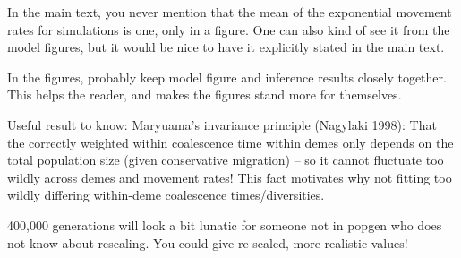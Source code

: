 \begin{point}{}
    In the main text, you never mention that the mean of the exponential
    movement rates for simulations is one, only in a figure. One can also kind
    of see it from the model figures, but it would be nice to have it
    explicitly stated in the main text.
\end{point}


\begin{point}{}
    In the figures, probably keep model figure and inference results closely
    together. This helps the reader, and makes the figures stand more for
    themselves.
\end{point}


\begin{point}{}
    Useful result to know: Maryuama’s invariance principle (Nagylaki 1998):
    That the correctly weighted within coalescence time within demes only
    depends on the total population size  (given conservative migration) -- so
    it cannot fluctuate too wildly across demes and movement rates! This fact
    motivates why not fitting too wildly differing within-deme coalescence
    times/diversities.
\end{point}


\begin{point}{\revref}
    400,000 generations will look a bit lunatic for someone not in
    popgen who does not know about rescaling. You could give re-scaled, more
    realistic values!
\end{point}


